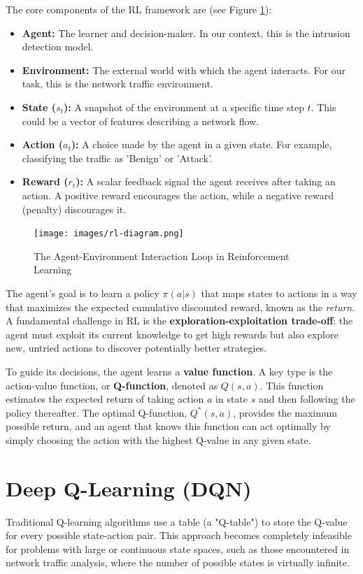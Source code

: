 \documentclass[16pt]{report}
\begin{document}
The core components of the RL framework are (see Figure \ref{fig:rl-diagram}):
\begin{itemize}
    \item \textbf{Agent:} The learner and decision-maker. In our context, this is the intrusion detection model.
    \item \textbf{Environment:} The external world with which the agent interacts. For our task, this is the network traffic environment.
    \item \textbf{State ($s_t$):} A snapshot of the environment at a specific time step $t$. This could be a vector of features describing a network flow.
    \item \textbf{Action ($a_t$):} A choice made by the agent in a given state. For example, classifying the traffic as 'Benign' or 'Attack'.
    \item \textbf{Reward ($r_t$):} A scalar feedback signal the agent receives after taking an action. A positive reward encourages the action, while a negative reward (penalty) discourages it.
\end{itemize}

\begin{figure}[H]
    \centering
    \texttt{[image: images/rl-diagram.png]}
    \caption{The Agent-Environment Interaction Loop in Reinforcement Learning}
    \label{fig:rl-diagram}
\end{figure}

The agent's goal is to learn a policy $\pi(a|s)$ that maps states to actions in a way that maximizes the expected cumulative discounted reward, known as the \textit{return}. A fundamental challenge in RL is the \textbf{exploration-exploitation trade-off}: the agent must exploit its current knowledge to get high rewards but also explore new, untried actions to discover potentially better strategies.

To guide its decisions, the agent learns a \textbf{value function}. A key type is the action-value function, or \textbf{Q-function}, denoted as $Q(s, a)$. This function estimates the expected return of taking action $a$ in state $s$ and then following the policy thereafter. The optimal Q-function, $Q^*(s, a)$, provides the maximum possible return, and an agent that knows this function can act optimally by simply choosing the action with the highest Q-value in any given state.

\section{Deep Q-Learning (DQN)}
Traditional Q-learning algorithms use a table (a "Q-table") to store the Q-value for every possible state-action pair. This approach becomes completely infeasible for problems with large or continuous state spaces, such as those encountered in network traffic analysis, where the number of possible states is virtually infinite.
\end{document}
